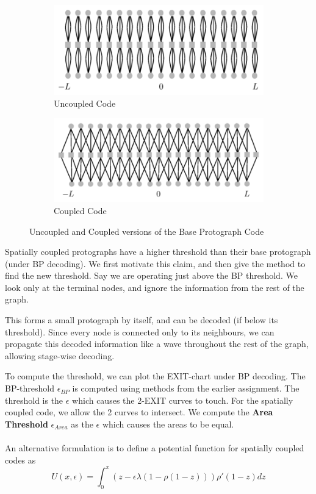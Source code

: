 \documentclass[paper=a4, fontsize=12pt]{scrartcl} %
\numberwithin{equation}{section} %
\numberwithin{figure}{section} %
\numberwithin{table}{section} %
\begin{document}
\begin{figure}
        \centering
        \begin{subfigure}{.5\textwidth}
  \centering
        \includegraphics[width=0.8\linewidth]{images/tc2}
                \caption{Uncoupled Code}
                \label{fig:uncoup}
                \end{subfigure}%
\begin{subfigure}{.5\textwidth}
  \centering
        \includegraphics[width=0.8\linewidth]{images/tc1}
                \caption{Coupled Code}
                \label{fig:coup}
	\end{subfigure}
            
\caption{Uncoupled and Coupled versions of the Base  Protograph Code}
\label{fig:qq}            
\end{figure}

Spatially coupled protographs have a higher threshold than their base protograph (under BP decoding). We first motivate this claim, and then give the method to find the new threshold. Say we are operating just above the BP threshold. We look only at the terminal nodes, and ignore the information from the rest of the graph. 

This forms a small protograph by itself, and can be decoded (if below its threshold). Since every node is connected only to its neighbours, we can propagate this decoded information like a wave throughout the rest of the graph, allowing stage-wise decoding. 

To compute the threshold, we can plot the EXIT-chart under BP decoding. The BP-threshold $\epsilon_{BP}$ is computed using methods from the earlier assignment. The threshold is the $\epsilon$ which causes the 2-EXIT curves to touch. For the spatially coupled code, we allow the 2 curves to intersect. We compute the \textbf{Area Threshold} $\epsilon_{Area}$ as the $\epsilon$ which causes the areas to be equal. \\ \\
An alternative formulation is to define a potential function for spatially coupled codes as
\begin{equation}
U(x,\epsilon) = \int_0^x \left(z-\epsilon \lambda \left(1-\rho\left( 1-z\right)\right)\right)\rho' (1-z) dz
\end{equation}
\end{document}
